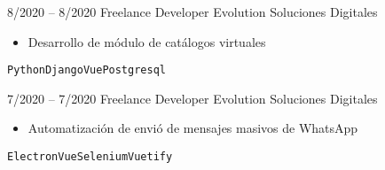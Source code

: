 
\begin{entrylist}
	\entry
	    {8/2020 -- 8/2020}
		{Freelance Developer}
		{Evolution Soluciones Digitales}
		{
		    \vspace{-5mm}
    	    \begin{itemize}
    	        \setlength\itemsep{0pt}
    	        \item Desarrollo de módulo de catálogos virtuales
    	    \end{itemize}
		    \texttt{Python}\slashsep\texttt{Django}\slashsep\texttt{Vue}\slashsep\texttt{Postgresql}
        }
	\entry
		{7/2020 -- 7/2020}
		{Freelance Developer}
		{Evolution Soluciones Digitales}
		{
		    \vspace{-5mm}
    	    \begin{itemize}
    	        \setlength\itemsep{0pt}
    	        \item Automatización de envió de mensajes masivos de WhatsApp
    	    \end{itemize}
		    \texttt{Electron}\slashsep\texttt{Vue}\slashsep\texttt{Selenium}\slashsep\texttt{Vuetify}
}
\end{entrylist}

